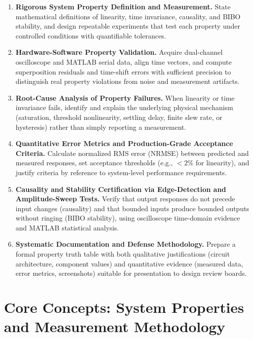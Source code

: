 \documentclass[11pt,letterpaper]{article}
\begin{document}
\begin{enumerate}
    \item \textbf{Rigorous System Property Definition and Measurement.} State mathematical definitions of linearity, time invariance, causality, and BIBO stability, and design repeatable experiments that test each property under controlled conditions with quantifiable tolerances.

    \item \textbf{Hardware-Software Property Validation.} Acquire dual-channel oscilloscope and MATLAB serial data, align time vectors, and compute superposition residuals and time-shift errors with sufficient precision to distinguish real property violations from noise and measurement artifacts.

    \item \textbf{Root-Cause Analysis of Property Failures.} When linearity or time invariance fails, identify and explain the underlying physical mechanism (saturation, threshold nonlinearity, settling delay, finite slew rate, or hysteresis) rather than simply reporting a measurement.

    \item \textbf{Quantitative Error Metrics and Production-Grade Acceptance Criteria.} Calculate normalized RMS error (NRMSE) between predicted and measured responses, set acceptance thresholds (e.g., $<2\%$ for linearity), and justify criteria by reference to system-level performance requirements.

    \item \textbf{Causality and Stability Certification via Edge-Detection and Amplitude-Sweep Tests.} Verify that output responses do not precede input changes (causality) and that bounded inputs produce bounded outputs without ringing (BIBO stability), using oscilloscope time-domain evidence and MATLAB statistical analysis.

    \item \textbf{Systematic Documentation and Defense Methodology.} Prepare a formal property truth table with both qualitative justifications (circuit architecture, component values) and quantitative evidence (measured data, error metrics, screenshots) suitable for presentation to design review boards.
\end{enumerate}

\clearpage

\section{Core Concepts: System Properties and Measurement Methodology}
\end{document}
